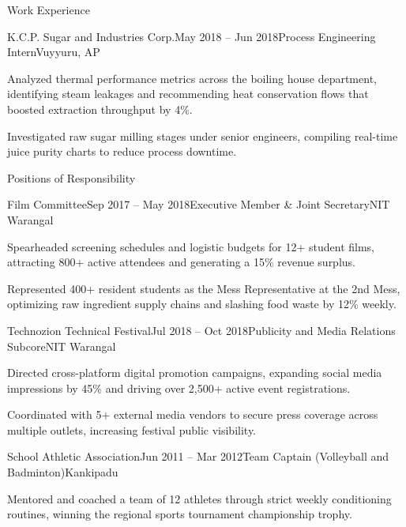 \documentclass{resume} %
\begin{document}
\begin{rSection}{Work Experience}

\begin{rSubsection}{K.C.P. Sugar and Industries Corp.}{May 2018 -- Jun 2018}{Process Engineering Intern}{Vuyyuru, AP}
\item Analyzed thermal performance metrics across the boiling house department, identifying steam leakages and recommending heat conservation flows that boosted extraction throughput by 4\%.
\item Investigated raw sugar milling stages under senior engineers, compiling real-time juice purity charts to reduce process downtime.
\end{rSubsection}

\end{rSection}

\begin{rSection}{Positions of Responsibility}

\begin{rSubsection}{Film Committee}{Sep 2017 -- May 2018}{Executive Member \& Joint Secretary}{NIT Warangal}
\item Spearheaded screening schedules and logistic budgets for 12+ student films, attracting 800+ active attendees and generating a 15\% revenue surplus.
\item Represented 400+ resident students as the Mess Representative at the 2nd Mess, optimizing raw ingredient supply chains and slashing food waste by 12\% weekly.
\end{rSubsection}

\begin{rSubsection}{Technozion Technical Festival}{Jul 2018 -- Oct 2018}{Publicity and Media Relations Subcore}{NIT Warangal}
\item Directed cross-platform digital promotion campaigns, expanding social media impressions by 45\% and driving over 2,500+ active event registrations.
\item Coordinated with 5+ external media vendors to secure press coverage across multiple outlets, increasing festival public visibility.
\end{rSubsection}

\begin{rSubsection}{School Athletic Association}{Jun 2011 -- Mar 2012}{Team Captain (Volleyball and Badminton)}{Kankipadu}
\item Mentored and coached a team of 12 athletes through strict weekly conditioning routines, winning the regional sports tournament championship trophy.
\end{rSubsection}

\end{rSection}
\end{document}
